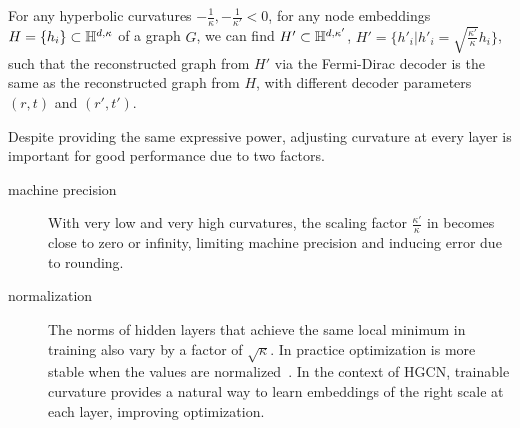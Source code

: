 \begin{theorem}\label{th:HGCNcurvature}
    For any hyperbolic curvatures $-\frac{1}{\kappa}, -\frac{1}{\kappa'} < 0$, for any node embeddings $H = \{h_i\} \subset \mathbb{H}^{d,\kappa}$ of a graph $G$, we can find $H' \subset \mathbb{H}^{d,\kappa'}$, $H' = \{h'_i | h'_i = \sqrt{\frac{\kappa'}{\kappa}}h_i\}$, such that the reconstructed graph from $H'$ via the Fermi-Dirac decoder is the same as the reconstructed graph from $H$, with different decoder parameters $(r, t)$ and $(r', t')$.    
\end{theorem}

Despite providing the same expressive power, adjusting curvature at every layer is important for good performance due to two factors.
\begin{description}
    \item[machine precision] With very low and very high curvatures, the scaling factor $\frac{\kappa'}{\kappa}$ in  becomes close to zero or infinity, limiting machine precision and inducing error due to rounding.
    \item[normalization] The norms of hidden layers that achieve the same local minimum in training also vary by a factor of $\sqrt{\kappa}$. In practice optimization is more stable when the values are normalized~\cite{ioffe2015batchNormalization}. In the context of HGCN, trainable curvature provides a natural way to learn embeddings of the right scale at each layer, improving optimization.
\end{description}